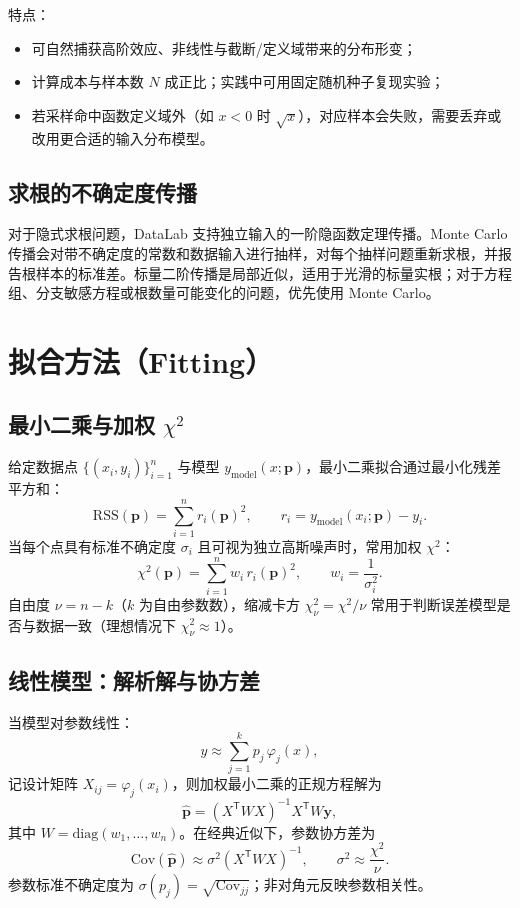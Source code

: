 \documentclass[UTF8,a4paper,11pt]{ctexart}
\begin{document}
特点：
\begin{itemize}
  \item 可自然捕获高阶效应、非线性与截断/定义域带来的分布形变；
  \item 计算成本与样本数 $N$ 成正比；实践中可用固定随机种子复现实验；
  \item 若采样命中函数定义域外（如 $x<0$ 时 $\sqrt{x}$），对应样本会失败，需要丢弃或改用更合适的输入分布模型。
\end{itemize}

\subsection{求根的不确定度传播}

对于隐式求根问题，DataLab 支持独立输入的一阶隐函数定理传播。Monte Carlo 传播会对带不确定度的常数和数据输入进行抽样，对每个抽样问题重新求根，并报告根样本的标准差。标量二阶传播是局部近似，适用于光滑的标量实根；对于方程组、分支敏感方程或根数量可能变化的问题，优先使用 Monte Carlo。

\section{拟合方法（Fitting）}

\subsection{最小二乘与加权 $\chi^2$}

给定数据点 $\{(x_i,y_i)\}_{i=1}^{n}$ 与模型 $y_{\mathrm{model}}(x;\bm{p})$，最小二乘拟合通过最小化残差平方和：
\begin{equation}
\mathrm{RSS}(\bm{p})=\sum_{i=1}^{n} r_i(\bm{p})^2,\qquad r_i=y_{\mathrm{model}}(x_i;\bm{p})-y_i.
\end{equation}
当每个点具有标准不确定度 $\sigma_i$ 且可视为独立高斯噪声时，常用加权 $\chi^2$：
\begin{equation}
\chi^2(\bm{p})=\sum_{i=1}^{n} w_i\,r_i(\bm{p})^2,\qquad w_i=\frac{1}{\sigma_i^2}.
\end{equation}
自由度 $\nu=n-k$（$k$ 为自由参数数），缩减卡方 $\chi^2_\nu=\chi^2/\nu$ 常用于判断误差模型是否与数据一致（理想情况下 $\chi^2_\nu\approx 1$）。

\subsection{线性模型：解析解与协方差}

当模型对参数线性：
\begin{equation}
y \approx \sum_{j=1}^{k} p_j\,\varphi_j(x),
\end{equation}
记设计矩阵 $X_{ij}=\varphi_j(x_i)$，则加权最小二乘的正规方程解为
\begin{equation}
\hat{\bm{p}}=(X^\mathsf{T}WX)^{-1}X^\mathsf{T}W\bm{y},
\end{equation}
其中 $W=\mathrm{diag}(w_1,\ldots,w_n)$。在经典近似下，参数协方差为
\begin{equation}
\mathrm{Cov}(\hat{\bm{p}})\approx \sigma^2 (X^\mathsf{T}WX)^{-1},\qquad
\sigma^2\approx \frac{\chi^2}{\nu}.
\end{equation}
参数标准不确定度为 $\sigma(p_j)=\sqrt{\mathrm{Cov}_{jj}}$；非对角元反映参数相关性。
\end{document}
